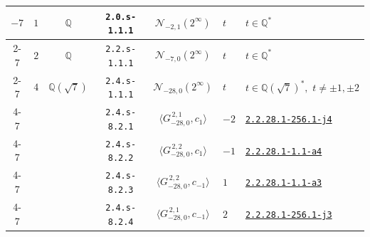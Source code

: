 \documentclass[11pt]{amsart}
\newcommand{\ecnflabel}[2]{\href{https://www.lmfdb.org/EllipticCurve/#1-#2}{\texttt{#1-#2}}}
\theoremstyle{definition}
\newcommand{\Q}{\mathbb Q}
\newcommand{\QQ}{\mathbb Q}
\begin{document}
{\begin{longtable}{|c|c|c|c|c|l|l|}
{$-7$} & $1$ & $\QQ$ & \texttt{2.0.s-1.1.1} & $\mathcal N_{-2, 1}(2^{\infty})$ & $t$ & $t\in \Q^*$ \\ \cline{2-7}
          & $2$ & $\QQ$& \texttt{2.2.s-1.1.1} & $\mathcal N_{-7, 0}(2^{\infty})$ & $t$ & $t\in \Q^*$ \\ \cline{2-7}
   &{$4$} & {$\QQ(\sqrt{7 })$} & \texttt{2.4.s-1.1.1} & $\mathcal N_{-28,0}(2^{\infty})$ &   $t$  &  $t\in \Q(\sqrt{7})^*,\,\, t\ne \pm 1,\pm 2$ \\  \cline{4-7} 
 & & & \texttt{2.4.s-8.2.1} & $\langle G^{\, 2,1}_{-28,0},c_{1}\rangle$ &   $-2$  &   \ecnflabel{2.2.28.1}{256.1-j4}\\ \cline{4-7}   
 & & & \texttt{2.4.s-8.2.2} & $\langle G^{\, 2,2}_{-28,0},c_{1}\rangle$ &   $-1$ &    \ecnflabel{2.2.28.1}{1.1-a4} \\ \cline{4-7}   
 & & & \texttt{2.4.s-8.2.3} & $\langle G^{\, 2,2}_{-28,0},c_{-1}\rangle$ &  $1$  &  \ecnflabel{2.2.28.1}{1.1-a3} \\ \cline{4-7}   
 & & & \texttt{2.4.s-8.2.4} & $\langle G^{\, 2,1}_{-28,0},c_{-1}\rangle$ &   $2$  &  \ecnflabel{2.2.28.1}{256.1-j3} \\ \hline 






\end{longtable}}
\end{document}

